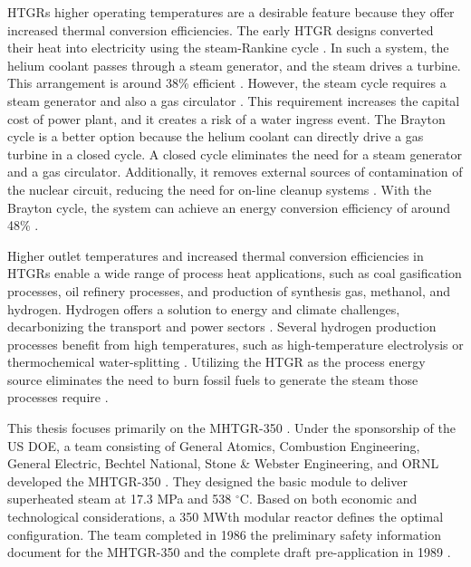 HTGRs higher operating temperatures are a desirable feature because they offer increased thermal conversion efficiencies.
The early \gls{HTGR} designs converted their heat into electricity using the steam-Rankine cycle \cite{herranz_power_2009}.
In such a system, the helium coolant passes through a steam generator, and the steam drives a turbine.
This arrangement is around 38\% efficient \cite{breeze_nuclear_2014}.
However, the steam cycle requires a steam generator and also a gas circulator \cite{no_review_2007}.
This requirement increases the capital cost of power plant, and it creates a risk of a water ingress event.
The Brayton cycle is a better option because the helium coolant can directly drive a gas turbine in a closed cycle.
A closed cycle eliminates the need for a steam generator and a gas circulator.
Additionally, it removes external sources of contamination of the nuclear circuit, reducing the need for on-line cleanup systems \cite{iaea_current_2001}.
With the Brayton cycle, the system can achieve an energy conversion efficiency of around 48\% \cite{breeze_nuclear_2014}.

Higher outlet temperatures and increased thermal conversion efficiencies in HTGRs enable a wide range of process heat applications, such as coal gasification processes, oil refinery processes, and production of synthesis gas, methanol, and hydrogen.
Hydrogen offers a solution to energy and climate challenges, decarbonizing the transport and power sectors \cite{nagashima_japans_2018}.
Several hydrogen production processes benefit from high temperatures, such as high-temperature electrolysis \cite{doenitz_hydrogen_1980} or thermochemical water-splitting \cite{yildiz_efficiency_2006}.
Utilizing the \gls{HTGR} as the process energy source eliminates the need to burn fossil fuels to generate the steam those processes require \cite{iaea_current_2001}.

This thesis focuses primarily on the \gls{MHTGR}-350 \cite{neylan_modular_1988} \cite{silady_licensing_1988}.
Under the sponsorship of the \gls{US} \gls{DOE}, a team consisting of General Atomics, Combustion Engineering, General Electric, Bechtel National, Stone \& Webster Engineering, and \gls{ORNL} developed the \gls{MHTGR}-350 \cite{neylan_modular_1988}.
They designed the basic module to deliver superheated steam at 17.3 MPa and 538 $^{\circ}$C.
Based on both economic and technological considerations, a 350 MWth modular reactor defines the optimal configuration.
The team completed in 1986 the preliminary safety information document for the MHTGR-350 and the complete draft pre-application in 1989 \cite{huning_steady_2014}.

